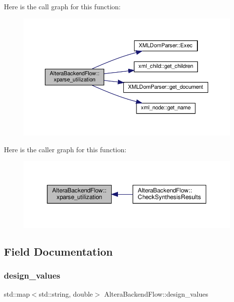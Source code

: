 Here is the call graph for this function\+:
\nopagebreak
\begin{figure}[H]
\begin{center}
\leavevmode
\includegraphics[width=350pt]{d2/d83/classAlteraBackendFlow_ac566361f8b25433c52b90ec30b100d35_cgraph}
\end{center}
\end{figure}
Here is the caller graph for this function\+:
\nopagebreak
\begin{figure}[H]
\begin{center}
\leavevmode
\includegraphics[width=345pt]{d2/d83/classAlteraBackendFlow_ac566361f8b25433c52b90ec30b100d35_icgraph}
\end{center}
\end{figure}


\subsection{Field Documentation}
\mbox{\label{classAlteraBackendFlow_a9ac59d97dbc735fef9f6ccb673ca179f}} 
\subsubsection{\texorpdfstring{design\+\_\+values}{design\_values}}
{\footnotesize\ttfamily std\+::map$<$std\+::string, double$>$ Altera\+Backend\+Flow\+::design\+\_\+values\hspace{0.3cm}{\ttfamily [private]}}




